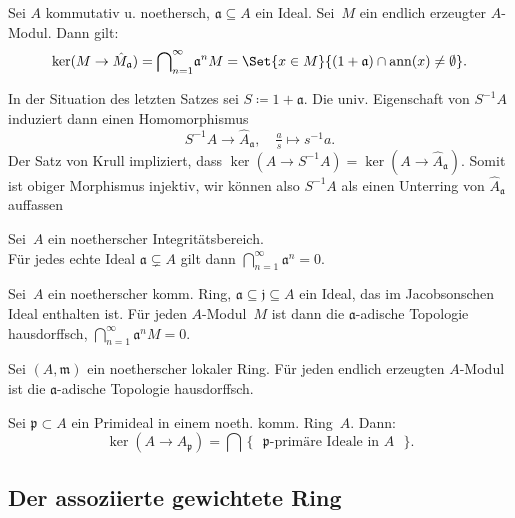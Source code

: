 \documentclass{cheat-sheet}
\DeclareMathOperator{\ann}{ann} %
\newcommand{\aaa}{\mathfrak{a}}
\newcommand{\jjj}{\mathfrak{j}}
\newcommand{\ppp}{\mathfrak{p}}
\newcommand{\mmm}{\mathfrak{m}}
\begin{document}

\begin{satz}
  Sei $A$ kommutativ u. noethersch, $\aaa \subseteq A$ ein Ideal.
  Sei~$M$ ein endlich erzeugter $A$-Modul.
  Dann gilt:
  \[
    \ker(M \to \hat{M}_\aaa) = {\bigcap}_{n=1}^\infty \aaa^n M = \Set{x \in M}{(1 + \aaa) \cap \ann(x) \neq \emptyset}.
  \]
\end{satz}

\begin{bem}
  In der Situation des letzten Satzes sei $S \coloneqq 1 + \aaa$.
  Die univ. Eigenschaft von $S^{-1} A$ induziert dann einen Homomorphismus
  \[
    S^{-1} A \to \hat{A}_\aaa, \quad
    \tfrac{a}{s} \mapsto s^{-1} a.
  \]
  Der Satz von Krull impliziert, dass $\ker(A \to S^{-1} A) = \ker(A \to \hat{A}_\aaa)$.
  Somit ist obiger Morphismus injektiv, wir können also $S^{-1} A$ als einen Unterring von $\hat{A}_\aaa$ auffassen
\end{bem}

\begin{kor}
  \begin{minipage}[t]{0.8 \linewidth}
    Sei~$A$ ein noetherscher Integritätsbereich. \\
    Für jedes echte Ideal $\aaa \subsetneq A$ gilt dann ${\bigcap}_{n=1}^\infty \aaa^n = 0$.
  \end{minipage}
\end{kor}

\begin{kor}
  Sei~$A$ ein noetherscher komm. Ring, $\aaa \subseteq \jjj \subseteq A$ ein Ideal, das im Jacobsonschen Ideal enthalten ist.
  Für jeden $A$-Modul~$M$ ist dann die $\aaa$-adische Topologie hausdorffsch, \dh{} ${\bigcap}_{n=1}^\infty \aaa^n M = 0$.
\end{kor}

\begin{kor}
  Sei $(A, \mmm)$ ein noetherscher lokaler Ring.
  Für jeden endlich erzeugten $A$-Modul ist die $\aaa$-adische Topologie hausdorffsch.
\end{kor}

\begin{kor}
  Sei $\ppp \subset A$ ein Primideal in einem noeth. komm. Ring~$A$.
  Dann:
  \[
    \ker (A \to A_\ppp) = \bigcap \, \{ \text{ $\ppp$-primäre Ideale in $A$ } \}.
  \]
\end{kor}

\subsection{Der assoziierte gewichtete Ring}
\end{document}
